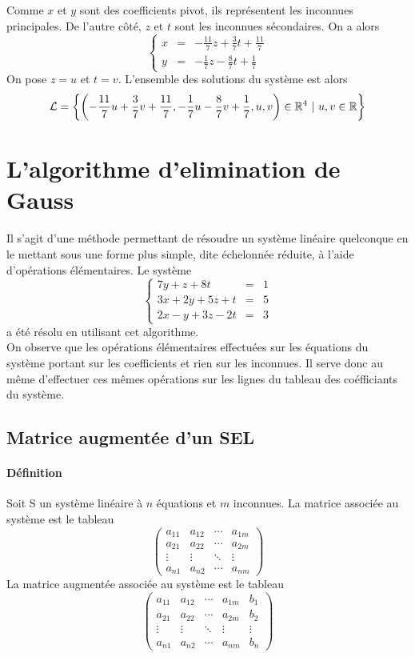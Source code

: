 Comme $x$ et $y$ sont des coefficients pivot, ils représentent les inconnues principales. De l'autre côté, $z$ et $t$ sont les inconnues sécondaires. On a alors
$$\left\{ \begin{array}{rcl}
  x & = & -\frac{11}{7} z + \frac{3}{7} t + \frac{11}{7} \\
  y & = & -\frac{1}{7} z - \frac{8}{7} t + \frac{1}{7}
\end{array} \right.$$
On pose $z=u$ et $t=v$. L'ensemble des solutions du système est alors
$$\mathcal{L} = \left\{ \left(-\frac{11}{7} u + \frac{3}{7} v + \frac{11}{7}, -\frac{1}{7} u - \frac{8}{7} v + \frac{1}{7}, u, v \right) \in \mathbb{R}^4 ~ \vert ~ u, v \in \mathbb{R} \right\}$$
%
%
\section{L'algorithme d'elimination de Gauss}
%
%
Il s'agit d'une méthode permettant de résoudre un système linéaire quelconque en le mettant sous une forme plus simple, dite échelonnée réduite, à l'aide d'opérations élémentaires. Le système
$$\left\{\begin{array}{rcl}
  7 y + z + 8 t & = & 1 \\
  3 x + 2 y + 5 z + t & = & 5 \\
  2 x - y + 3 z - 2 t & = & 3
\end{array} \right.$$
a été résolu en utilisant cet algorithme. \\
On observe que les opérations élémentaires effectuées sur les équations du système portant sur les coefficients et rien sur les inconnues. Il serve donc au même d'effectuer ces mêmes opérations sur les lignes du tableau des coéfficiants du système.

%
\subsection{Matrice augmentée d'un SEL}
%
\paragraph{Définition} Soit S un système linéaire à $n$ équations et $m$ inconnues. La matrice associée au système est le tableau
$$\begin{pmatrix}
  a_{11} & a_{12} & \cdots & a_{1m} \\
  a_{21} & a_{22} & \cdots & a_{2m} \\
  \vdots  & \vdots  & \ddots & \vdots  \\
  a_{n1} & a_{n2} & \cdots & a_{nm}
 \end{pmatrix}$$
La matrice augmentée associée au système est le tableau
$$\left( \begin{array}{cccc|c}
  a_{11} & a_{12} & \cdots & a_{1m} & b_{1} \\
  a_{21} & a_{22} & \cdots & a_{2m} & b_{2} \\
  \vdots  & \vdots  & \ddots & \vdots & \vdots  \\
  a_{n1} & a_{n2} & \cdots & a_{nm} & b_{n}
 \end{array} \right) $$
 
